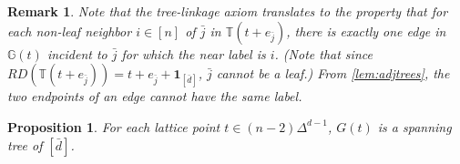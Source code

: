 \documentclass[10pt,a4paper]{amsart}
\newtheorem{remark}{Remark}
\newtheorem{proposition}{Proposition}
\begin{document}
\begin{remark}\label{rem:basicproperties}
    Note that the tree-linkage axiom translates to the property that for each non-leaf neighbor $i\in [n]$ of $\bar{j}$ in $\mathbb{T}(t+e_{\bar{j}})$, there is exactly one edge in $\mathbb{G}(t)$ incident to $\bar{j}$ for which the near label is $i$. (Note that since $RD(\mathbb{T}(t+e_{\bar{j}})) = t + e_{\bar{j}} + \mathbf{1}_{[\bar{d}]}$, $\bar{j}$ cannot be a leaf.) From \cref{lem:adjtrees}, the two endpoints of an edge cannot have the same label.
\end{remark}

\begin{proposition}\label{prop:treelinkagetree}
    For each lattice point $t\in (n-2)\Delta^{d-1}$, $G(t)$ is a spanning tree of $[\bar{d}]$.
\end{proposition}
\end{document}
